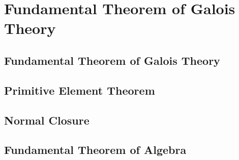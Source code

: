 \chapter{Fundamental Theorem of Galois Theory}

\section{Fundamental Theorem of Galois Theory}

\section{Primitive Element Theorem}

\section{Normal Closure}

\section{Fundamental Theorem of Algebra}